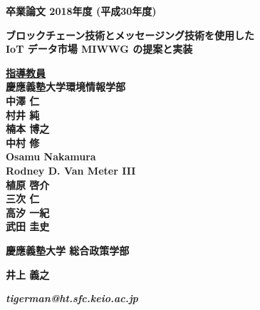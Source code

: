 \pagestyle{empty}

\begin{center}

\vspace{5cm}

\textbf{\Large 卒業論文 2018年度 (平成30年度)}

\vspace{2cm}

\textbf{\LARGE ブロックチェーン技術とメッセージング技術を使用した \\ IoT データ市場 MIWWG の提案と実装}

\vspace{3cm}

\textbf{\underline{\large 指導教員}}\\
\textbf{慶應義塾大学環境情報学部}\\
\vspace{0.5cm}
\textbf{\Large 中澤 仁}\\
\textbf{\Large 村井 純}\\
\textbf{\Large 楠本 博之}\\
\textbf{\Large 中村 修}\\
\textbf{\Large Osamu Nakamura}\\
\textbf{\Large Rodney D. Van Meter III}\\
\textbf{\Large 植原 啓介}\\
\textbf{\Large 三次 仁}\\
\textbf{\Large 高汐 一紀}\\
\textbf{\Large 武田 圭史}\\

\vspace{5cm}

\textbf{\LARGE 慶應義塾大学 \LARGE 総合政策学部}

\vspace{.5em}

\textbf{\LARGE 井上 義之}

\vspace{.3em}

\textbf{\it tigerman@ht.sfc.keio.ac.jp}



\newpage

\end{center}

\pagestyle{plain}
